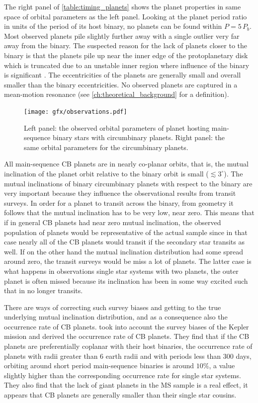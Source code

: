 \documentclass[twoside,openright,titlepage,numbers=noenddot,headinclude,%
                footinclude=true,cleardoublepage=empty,abstractoff, 
                BCOR=5mm,paper=a4,fontsize=11pt,%
                american,%
                ]{scrreprt}%
\begin{document}
The right panel of \cref{table:timing_planets} shows the planet properties 
in same space of orbital parameters as the left panel. 
Looking at the planet period ratio in units of the
period of its host binary, no planets can be found within $P=5\,P_b$. Most 
observed planets pile slightly further away with a single outlier very far 
away from the binary. The suspected reason for the lack of planets closer
to the binary is that the planets pile up near the inner edge of the 
protoplanetary disk which is truncated due to an unstable inner region
where influence of the binary is significant \citep{nelson2007}. The 
eccentricities of the planets are generally small and overall smaller than
the binary eccentricities. No observed planets are captured 
in a mean-motion resonance
(see \cref{ch:theoretical_background} for a definition).
\begin{figure}[htb]
\centering
\texttt{[image: gfx/observations.pdf]}
    \caption[Orbital parameters of main-sequence CB planets.]{Left panel: 
    the observed orbital parameters 
    of planet hosting main-sequence binary stars with 
    circumbinary planets. Right panel: the same orbital parameters for the 
    circumbinary planets.}
\label{fig:observations}
\end{figure}

All main-sequence CB planets are in nearly co-planar orbits, that is,
the mutual inclination of the planet orbit relative to the binary orbit is 
small ($\lesssim 3^{\circ}$).  The mutual inclinations of binary circumbinary 
planets with respect to the binary are very important because they influence
the observational results from transit surveys. In order for a planet to
transit across the binary, from geometry it follows that the mutual inclination
has to be very low, near zero. This means that if in general CB planets had
near zero mutual inclination, the observed population of planets would be
representative of the actual sample since in that case nearly all of the
CB planets would transit if the secondary star transits as well. If
on the other hand the mutual inclination distribution had some spread around
zero, the transit surveys would be miss a lot of planets. The latter case
is what happens in observations single star systems with two planets, the
outer planet is often missed because its inclination has been in some way
excited such that in no longer transits.

There are ways of correcting such survey biases and getting to the true 
underlying mutual inclination distribution, and as a consequence also the
occurrence rate of CB planets. \citet{Armstrong2014} took into account the 
survey biases of the Kepler mission and derived the occurrence rate of CB
planets. They find that if the CB planets are preferentially coplanar
with their host binaries, the occurrence rate of planets with radii greater
than 6 earth radii and with periods less than 300 days, orbiting around
short period main-sequence binaries is around $10\%$, a value slightly 
higher than 
the corresponding occurrence rate for single star systems. They also
find that the lack of giant planets in the MS sample is a real effect,
it appears that CB planets are generally smaller than their
single star cousins.
\end{document}
